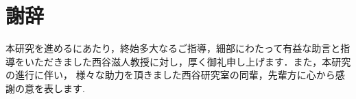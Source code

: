 \chapter*{謝辞} 
本研究を進めるにあたり，終始多大なるご指導，細部にわたって有益な助言と指導をいただきました西谷滋人教授に対し，厚く御礼申し上げます．また，本研究の進行に伴い，
様々な助力を頂きました西谷研究室の同輩，先輩方に心から感謝の意を表します.